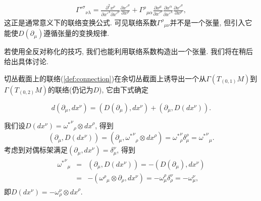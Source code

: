 \begin{eqnarray}
  {{\varGamma'}^\sigma}_{\nu\lambda}=\frac{\partial^2{x^\rho}}{\partial{x'}^\lambda\partial{x'}^\nu}\frac{\partial{{x'}^\sigma}}{\partial{x^\rho}}+{\varGamma^\rho}_{\mu\alpha}\frac{\partial{x^\mu}}{\partial{x'}^\nu}\frac{\partial{x}^\alpha}{\partial{x'}^\lambda}\frac{\partial{{x'}^\sigma}}{\partial{x^\rho}},
\end{eqnarray}
这正是通常意义下的联络变换公式. 可见联络系数${\varGamma^\rho}_{\mu\nu}$并不是一个张量, 但引入它能使$D(\partial_\mu)$遵循张量的变换规律.

\begin{remark}
若使用全反对称化的技巧, 我们也能利用联络系数构造出一个张量. 我们将在稍后给出具体讨论.
\end{remark}

切丛截面上的联络(\ref{def:connection})在余切丛截面上诱导出一个从$\varGamma(T_{(0, 1)}M)$到$\varGamma(T_{(0, 2)}M)$的联络(仍记为$D$), 它由下式确定

$$d\left(\partial_\mu, dx^\nu\right)=\left(D(\partial_\mu), dx^\nu\right)+\left(\partial_\mu, D(dx^\nu)\right).$$

我们设$D(dx^\nu)={{\omega^*}^\nu}_\rho\otimes{dx}^\rho$, 得到
$$\left(\partial_\mu, D(dx^\nu)\right)=\left(\partial_\mu, {{\omega^*}^\nu}_\rho\otimes{dx}^\rho\right)={\omega^*}^\nu_\rho\delta^\rho_\mu={{\omega^*}^\nu}_\mu. $$
考虑到对偶标架满足$\left(\partial_\mu, dx^\nu\right)=\delta^\nu_\mu$, 得到
\begin{eqnarray}\begin{aligned}
    {{\omega^*}^\nu}_\mu&=&\left(\partial_\mu, D(dx^\nu)\right)=-\left(D(\partial_\mu), dx^\nu\right)\\
    &=&-\left({\omega^\rho}_\mu\otimes\partial_\rho, dx^\nu\right)=-{\omega}^\rho_\mu\delta^\nu_\rho=-{\omega}^\nu_\mu,
\end{aligned}\end{eqnarray}
即$D(dx^\nu)=-{\omega}^\nu_\rho\otimes{dx}^\rho$.

